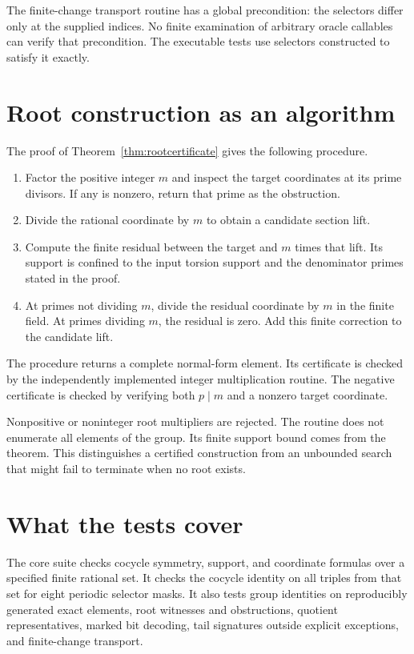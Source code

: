 The finite-change transport routine has a global precondition: the selectors differ only at the supplied indices. No finite examination of arbitrary oracle callables can verify that precondition. The executable tests use selectors constructed to satisfy it exactly.

\section{Root construction as an algorithm}
The proof of Theorem~\ref{thm:rootcertificate} gives the following procedure.
\begin{enumerate}
\item Factor the positive integer $m$ and inspect the target coordinates at its prime divisors. If any is nonzero, return that prime as the obstruction.
\item Divide the rational coordinate by $m$ to obtain a candidate section lift.
\item Compute the finite residual between the target and $m$ times that lift. Its support is confined to the input torsion support and the denominator primes stated in the proof.
\item At primes not dividing $m$, divide the residual coordinate by $m$ in the finite field. At primes dividing $m$, the residual is zero. Add this finite correction to the candidate lift.
\end{enumerate}
The procedure returns a complete normal-form element. Its certificate is checked by the independently implemented integer multiplication routine. The negative certificate is checked by verifying both $p\mid m$ and a nonzero target coordinate.

Nonpositive or noninteger root multipliers are rejected. The routine does not enumerate all elements of the group. Its finite support bound comes from the theorem. This distinguishes a certified construction from an unbounded search that might fail to terminate when no root exists.

\section{What the tests cover}
The core suite checks cocycle symmetry, support, and coordinate formulas over a specified finite rational set. It checks the cocycle identity on all triples from that set for eight periodic selector masks. It also tests group identities on reproducibly generated exact elements, root witnesses and obstructions, quotient representatives, marked bit decoding, tail signatures outside explicit exceptions, and finite-change transport.

